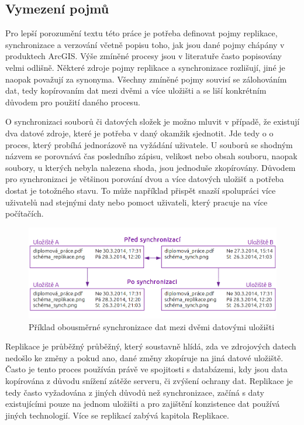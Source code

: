         \subsection{Vymezení pojmů}
        Pro lepší porozumění textu této práce je potřeba definovat pojmy replikace, synchronizace a verzování včetně popisu toho, jak jsou dané pojmy chápány v produktech ArcGIS. Výše zmíněné procesy jsou v literatuře často popisovány velmi odlišně. Některé zdroje pojmy replikace a synchronizace rozlišují, jiné je naopak považují za synonyma. Všechny zmíněné pojmy souvisí se zálohováním dat, tedy kopírovaním dat mezi dvěmi a více uložišti a se liší konkrétním důvodem pro použití daného procesu. 

O synchronizaci souborů či datových složek je možno mluvit v případě, že existují dva datové zdroje, které je potřeba v daný okamžik sjednotit. Jde tedy o o proces, který probíhá jednorázově na vyžádání uživatele. U souborů se shodným názvem se porovnává čas posledního zápisu, velikost nebo obsah souboru, naopak soubory, u kterých nebyla nalezena shoda, jsou jednoduše zkopírovány. Důvodem pro synchronizaci je většinou porování dvou a více datových uložišť a potřeba dostat je totožného stavu. To může například přispět snazší spolupráci více uživatelů nad stejnými daty nebo pomoct uživateli, který pracuje na více počítačích.

          \begin{figure}[H]
            \centering
            \includegraphics[scale=1]{../../../grafy/obr/schema_synchronizace_maxiTence.png}
            \caption {Příklad obousměrné synchronizace dat mezi dvěmi datovými uložišti}
          \end{figure}

Replikace je průběžný průběžný, který soustavně hlídá, zda ve zdrojových datech nedošlo ke změny a pokud ano, dané změny zkopíruje na jiná datové uložiště. Často je tento proces používán právě ve spojitosti s databázemi, kdy jsou data kopírována z důvodu snížení zátěže serveru, či zvýšení ochrany dat. Replikace je tedy často vyžadována z jiných důvodů než synchronizace, začíná s daty existujícími pouze na jednom uložišti a pro zajištění konzistence dat používá jiných technologií. Více se replikací zabývá kapitola  Replikace.

